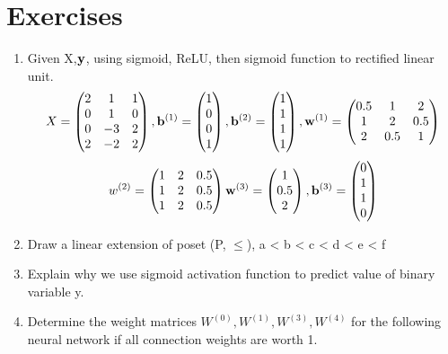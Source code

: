      

\section{Exercises}
\begin{enumerate}
    \item Given X,${\vy}$, using sigmoid, ReLU, then sigmoid function to rectified linear unit.
       \begin{equation*}  
        X = \begin{pmatrix}
        2 & 1 & 1\\
        0 & 1 & 0\\
        0 & -3 & 2\\
        2 & -2 & 2
        \end{pmatrix},
        \vb^{(1)} = \begin{pmatrix}
         1\\
         0\\
         0\\
         1
        \end{pmatrix},
        \vb^{(2)} = \begin{pmatrix}
         1\\
         1\\
         1\\
         1
        \end{pmatrix},
        \vw^{(1)} =  \begin{pmatrix}
         0.5 & 1 & 2\\
         1 & 2 & 0.5\\
         2 & 0.5 & 1
        \end{pmatrix}
        \end{equation*}
        \begin{equation*}
         w^{(2)} =  \begin{pmatrix}
         1 & 2 & 0.5\\
         1 & 2 & 0.5\\
         1 & 2 & 0.5
        \end{pmatrix}
         \vw^{(3)} =  \begin{pmatrix}
         1\\
         0.5\\
         2
        \end{pmatrix},
        \vb^{(3)} = \begin{pmatrix}
         0\\
         1\\
         1\\
         0
        \end{pmatrix}
        \end{equation*}
    \item Draw a linear extension of poset (P, $\leq$), a < b < c < d < e < f
    \item Explain why we use sigmoid activation function to predict value of binary variable y.
    \item Determine the weight matrices $W^{(0)}, W^{(1)}, W^{(3)}, W^{(4)}$ for the following neural network if all connection weights are worth 1.
    

\end{enumerate}
